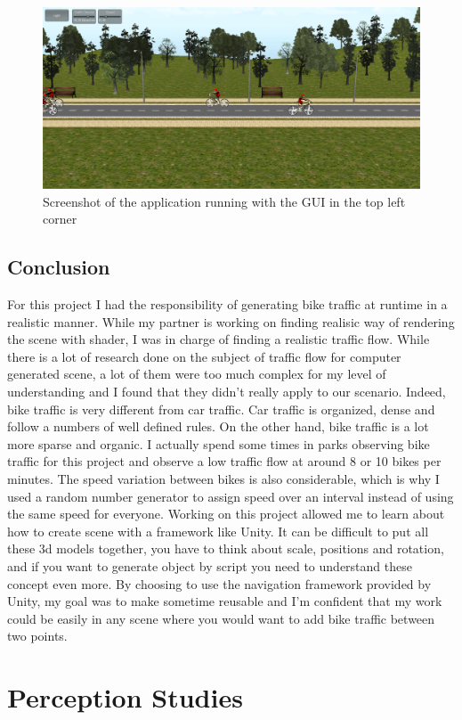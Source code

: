 \documentclass{scrartcl}
\begin{document}
		\begin{figure}[h]
			\includegraphics[width=\textwidth]{AppWithGUI}
			\caption{Screenshot of the application running with the GUI in the top left corner}
			\label{fig:app_gui}
		\end{figure}
		
	\subsection{Conclusion}
		For this project I had the responsibility of generating bike traffic at runtime in a realistic manner. While my partner is working on finding realisic way of rendering 
		the scene with shader, I was in charge of finding a realistic traffic flow. While there is a lot of research done on the subject of traffic flow for computer generated 
		scene, a lot of them were too much complex for my level of understanding and I found that they didn't really apply to our scenario. Indeed, bike traffic is very 
		different from car traffic. Car traffic is organized, dense and follow a numbers of well defined rules. On the other hand, bike traffic is a lot more sparse and organic. 
		I actually spend some times in parks observing bike traffic for this project and observe a low traffic flow at around 8 or 10 bikes per minutes. The speed variation 
		between bikes is also considerable, which is why I used a random number generator to assign speed over an interval instead of using the same speed for everyone. 
		Working on this project allowed me to learn about how to create scene with a framework like Unity. It can be difficult to put all these 3d models together, you have 
		to think about scale, positions and rotation, and if you want to generate object by script you need to understand these concept even more. By choosing to use the 
		navigation framework provided by Unity, my goal was to make sometime reusable and I'm confident that my work could be easily in any scene where you would want 
		to add bike traffic between two points.
		
\section{Perception Studies}


\printbibliography
\end{document}
